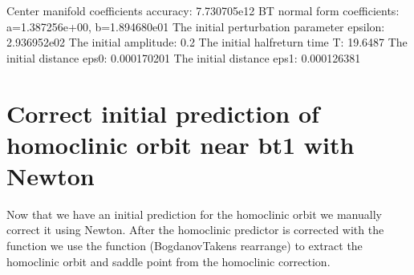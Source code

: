 \documentclass[letterpaper,10pt,english]{jupyterBook}
\begin{document}
\begin{sphinxVerbatim}[commandchars=\\\{\}]
\PYG{p}{[}\PYG{p}{]}
\end{sphinxVerbatim}

\begin{sphinxVerbatim}[commandchars=\\\{\}]
Center manifold coefficients\PYGZsq{} accuracy: 7.730705e\PYGZhy{}12
BT normal form coefficients:
a=1.387256e+00,	 b=\PYGZhy{}1.894680e\PYGZhy{}01
The initial perturbation parameter epsilon:  2.936952e\PYGZhy{}02
The initial amplitude: 0.2
The initial half\PYGZhy{}return time T: 19.6487
The initial distance eps0: 0.000170201
The initial distance eps1: 0.000126381
\end{sphinxVerbatim}


\section{Correct initial prediction of homoclinic orbit near bt1 with Newton}
\label{\detokenize{HomoclinicRGflows:correct-initial-prediction-of-homoclinic-orbit-near-bt1-with-newton}}
\sphinxAtStartPar
Now that we have an initial prediction for the homoclinic orbit we
manually correct it using Newton. After the homoclinic predictor is corrected
with the  function  we use the function 
(Bogdanov\sphinxhyphen{}Takens rearrange) to extract the homoclinic orbit and saddle point
from the homoclinic correction.
\end{document}
